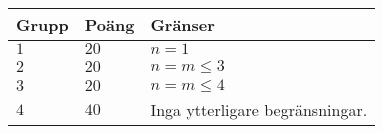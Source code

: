 \noindent
\begin{tabular}{| l | l | p{12cm} |}
  \hline
  \textbf{Grupp} & \textbf{Poäng} & \textbf{Gränser} \\ \hline
  $1$    & $20$      & $n = 1$ \\ \hline
  $2$    & $20$      & $n = m \leq 3$ \\ \hline
  $3$    & $20$      & $n = m \leq 4$ \\ \hline
  $4$    & $40$      & Inga ytterligare begränsningar. \\ \hline
\end{tabular}
